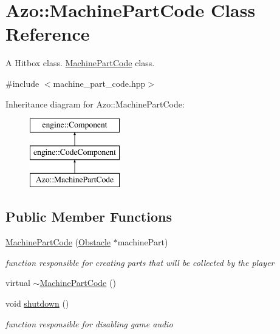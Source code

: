\hypertarget{class_azo_1_1_machine_part_code}{}\section{Azo\+:\+:Machine\+Part\+Code Class Reference}
\label{class_azo_1_1_machine_part_code}


A Hitbox class. \hyperlink{class_azo_1_1_machine_part_code}{Machine\+Part\+Code} class.  




{\ttfamily \#include $<$machine\+\_\+part\+\_\+code.\+hpp$>$}

Inheritance diagram for Azo\+:\+:Machine\+Part\+Code\+:\begin{figure}[H]
\begin{center}
\leavevmode
\includegraphics[height=3.000000cm]{class_azo_1_1_machine_part_code}
\end{center}
\end{figure}
\subsection*{Public Member Functions}
\begin{DoxyCompactItemize}
\item 
\hyperlink{class_azo_1_1_machine_part_code_a4ce37129563be975a557942ab8c897f0}{Machine\+Part\+Code} (\hyperlink{class_azo_1_1_obstacle}{Obstacle} $\ast$machine\+Part)
\begin{DoxyCompactList}\small\item\em function responsible for creating parts that will be collected by the player \end{DoxyCompactList}\item 
virtual \hyperlink{class_azo_1_1_machine_part_code_a3769b1d5af7d63b989369aef122760b5}{$\sim$\+Machine\+Part\+Code} ()
\item 
void \hyperlink{class_azo_1_1_machine_part_code_aea9e8e5ccc20e0ac975277104b29d0bf}{shutdown} ()
\begin{DoxyCompactList}\small\item\em function responsible for disabling game audio \end{DoxyCompactList}\end{DoxyCompactItemize}

